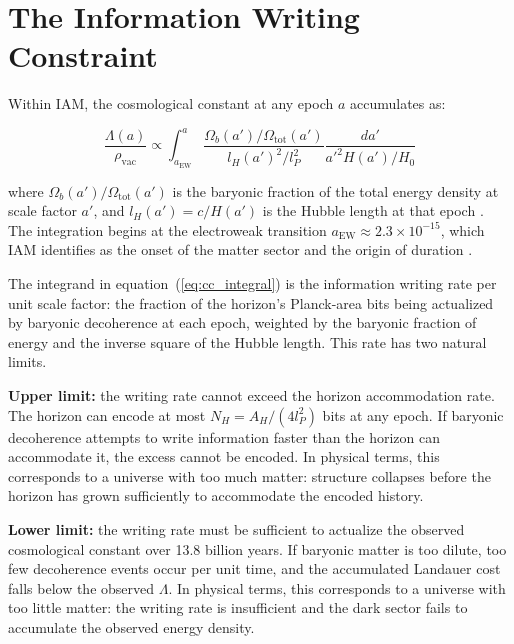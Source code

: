 \documentclass[12pt,a4paper]{article}
\begin{document}
\section{The Information Writing Constraint}
\label{sec:constraint}

Within IAM, the cosmological constant at any epoch $a$ accumulates as:

\begin{equation}
\frac{\Lambda(a)}{\rho_\mathrm{vac}} \propto
\int_{a_\mathrm{EW}}^{a}
\frac{\Omega_b(a') / \Omega_\mathrm{tot}(a')}{l_H(a')^2 / l_P^2}
\frac{da'}{a'^2 H(a')/H_0}
\label{eq:cc_integral}
\end{equation}

where $\Omega_b(a') / \Omega_\mathrm{tot}(a')$ is the baryonic fraction
of the total energy density at scale factor $a'$, and $l_H(a') = c /
H(a')$ is the Hubble length at that epoch \citep{mahaffey2026_cc}. The
integration begins at the electroweak transition $a_\mathrm{EW} \approx
2.3 \times 10^{-15}$, which IAM identifies as the onset of the matter
sector and the origin of duration \citep{mahaffey2026_higgs}.

The integrand in equation~(\ref{eq:cc_integral}) is the information
writing rate per unit scale factor: the fraction of the horizon's
Planck-area bits being actualized by baryonic decoherence at each epoch,
weighted by the baryonic fraction of energy and the inverse square of
the Hubble length. This rate has two natural limits.

\textbf{Upper limit:} the writing rate cannot exceed the horizon
accommodation rate. The horizon can encode at most $N_H = A_H / (4
l_P^2)$ bits at any epoch. If baryonic decoherence attempts to write
information faster than the horizon can accommodate it, the excess
cannot be encoded. In physical terms, this corresponds to a universe
with too much matter: structure collapses before the horizon has grown
sufficiently to accommodate the encoded history.

\textbf{Lower limit:} the writing rate must be sufficient to actualize
the observed cosmological constant over 13.8 billion years. If baryonic
matter is too dilute, too few decoherence events occur per unit time,
and the accumulated Landauer cost falls below the observed $\Lambda$.
In physical terms, this corresponds to a universe with too little
matter: the writing rate is insufficient and the dark sector fails to
accumulate the observed energy density.
\end{document}
